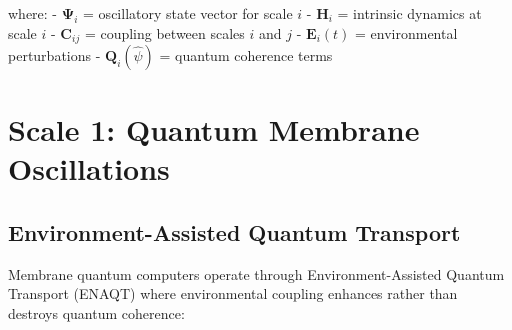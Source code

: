 \documentclass[twocolumn]{article}
\begin{document}
where:
- $\mathbf{\Psi}_i$ = oscillatory state vector for scale $i$
- $\mathbf{H}_i$ = intrinsic dynamics at scale $i$
- $\mathbf{C}_{ij}$ = coupling between scales $i$ and $j$
- $\mathbf{E}_i(t)$ = environmental perturbations
- $\mathbf{Q}_i(\hat{\psi})$ = quantum coherence terms

\section{Scale 1: Quantum Membrane Oscillations}

\subsection{Environment-Assisted Quantum Transport}

Membrane quantum computers operate through Environment-Assisted Quantum Transport (ENAQT) where environmental coupling enhances rather than destroys quantum coherence:
\end{document}
